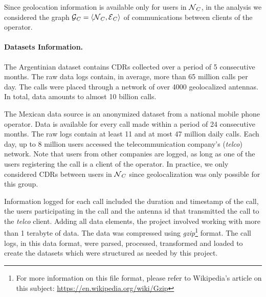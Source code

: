 Since geolocation information is available only for users in $\operatorname{\mathcal{N}}_C$, in the analysis we considered the graph $\operatorname{\mathcal{G}}_C = \left< \operatorname{\mathcal{N}}_C, \operatorname{\mathcal{E}}_C \right>$ of communications between clients of the operator.

\paragraph{Datasets Information.}

The Argentinian dataset contains CDRs collected over a period of 5 consecutive months. The raw data logs contain, in average, more than 65 million calls per day. 
The calls were placed through a network of over 4000 geolocalized antennas. In total, data amounts to almost 10 billion calls.

The Mexican data source is an anonymized dataset from a national mobile phone operator. Data is available for every call made within a period of 24 consecutive months. The raw logs contain at least 11 and at most 47 million daily calls. 
Each day, up to 8 million users accessed the telecommunication company's (\textit{telco}) network. Note that users from other companies are logged, as long as one of the users registering the call is a client of the operator. In practice, we only considered CDRs between users in $\operatorname{\mathcal{N}}_C$ since geolocalization was only possible for this group.

Information logged for each call included the duration and timestamp of the call, the users participating in the call and the antenna id that transmitted the call to the \emph{telco} client.
Adding all data elements, the project involved working with more than 1 terabyte of data.
The data was compressed using \emph{gzip}\footnote{For more information on this file format, please refer to Wikipedia's article on this subject: \url{https://en.wikipedia.org/wiki/Gzip}} format.
The call logs, in this data format, were parsed, processed, transformed and loaded to create the datasets which were structured as needed by this project.

